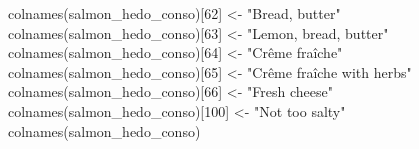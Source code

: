 \documentclass[
]{book}
\newenvironment{Shaded}{\begin{snugshade}}{\end{snugshade}}
\newcommand{\DecValTok}[1]{\textcolor[rgb]{0.00,0.00,0.81}{#1}}
\newcommand{\FunctionTok}[1]{\textcolor[rgb]{0.00,0.00,0.00}{#1}}
\newcommand{\NormalTok}[1]{#1}
\newcommand{\OtherTok}[1]{\textcolor[rgb]{0.56,0.35,0.01}{#1}}
\newcommand{\StringTok}[1]{\textcolor[rgb]{0.31,0.60,0.02}{#1}}
\begin{document}
\begin{Shaded}
\begin{Highlighting}[]
\FunctionTok{colnames}\NormalTok{(salmon\_hedo\_conso)[}\DecValTok{62}\NormalTok{] }\OtherTok{\textless{}{-}} \StringTok{"Bread, butter"}
\FunctionTok{colnames}\NormalTok{(salmon\_hedo\_conso)[}\DecValTok{63}\NormalTok{] }\OtherTok{\textless{}{-}} \StringTok{"Lemon, bread, butter"}
\FunctionTok{colnames}\NormalTok{(salmon\_hedo\_conso)[}\DecValTok{64}\NormalTok{] }\OtherTok{\textless{}{-}} \StringTok{"Crême fraîche"}
\FunctionTok{colnames}\NormalTok{(salmon\_hedo\_conso)[}\DecValTok{65}\NormalTok{] }\OtherTok{\textless{}{-}} \StringTok{"Crême fraîche with herbs"}
\FunctionTok{colnames}\NormalTok{(salmon\_hedo\_conso)[}\DecValTok{66}\NormalTok{] }\OtherTok{\textless{}{-}} \StringTok{"Fresh cheese"}
\FunctionTok{colnames}\NormalTok{(salmon\_hedo\_conso)[}\DecValTok{100}\NormalTok{] }\OtherTok{\textless{}{-}} \StringTok{"Not too salty"}
\FunctionTok{colnames}\NormalTok{(salmon\_hedo\_conso)}
\end{Highlighting}
\end{Shaded}
\end{document}
